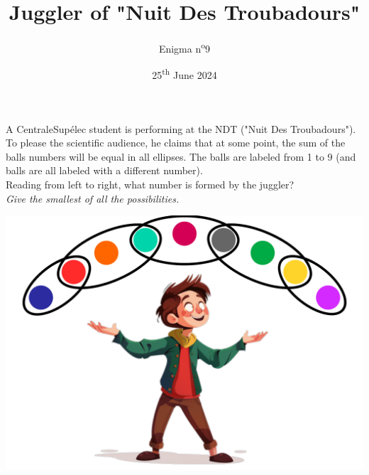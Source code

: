 \documentclass[a4paper, top=10mm]{article}
\title{\textbf{\huge{Juggler of "Nuit Des Troubadours"}}}
\author{Enigma n\textsuperscript{o}9}
\date{25\textsuperscript{th} June 2024}
\begin{document}
	\maketitle
	
	\Large
	A CentraleSupélec student is performing at the NDT ("Nuit Des Troubadours").
	To please the scientific audience, he claims that at some point, the sum of the balls numbers will be equal in all ellipses.
	The balls are labeled from 1 to 9 (and balls are all labeled with a different number).\\
	Reading from left to right, what number is formed by the juggler?\\
	\textit{Give the smallest of all the possibilities.}
	
	\vspace{2cm}
	
	\begin{center}
		\includegraphics[width=\linewidth]{09juggler.pdf}
	\end{center}
	
	
\end{document}
